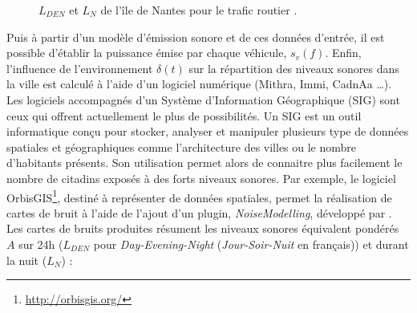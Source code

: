 \begin{figure}[t]
\centering
{}
\caption{$L_{DEN}$  et $L_N$  de l'île de Nantes pour le trafic routier \cite{nantes_carte}.}
\label{fig:carto_nantes}
\end{figure}

Puis à partir d'un modèle d'émission sonore et de ces données d'entrée, il est possible d'établir la puissance émise par chaque véhicule, $s_{v}(f)$.
Enfin, l'influence de l'environnement $\delta(t)$ sur la répartition des niveaux sonores dans la ville est calculé à l'aide d'un logiciel numérique (Mithra, Immi, CadnAa \dots). Les logiciels accompagnés d'un Système d'Information Géographique (SIG) sont ceux qui offrent actuellement le plus de possibilités. Un SIG est un outil informatique conçu pour stocker, analyser et manipuler plusieurs type de données spatiales et géographiques comme l'architecture des villes ou le nombre d'habitants présents. 
Son utilisation permet alors de connaitre plus facilement le nombre de citadins exposés à des forts niveaux sonores. 
Par exemple, le logiciel OrbisGIS\footnote{\url{http://orbisgis.org/}}, destiné à représenter de données spatiales, permet la réalisation de cartes de bruit à l'aide de l'ajout d'un plugin, \textit{NoiseModelling}, développé par \cite{fortin}. \\

Les cartes de bruits produites résument les niveaux sonores équivalent pondérés $A$ sur 24h ($L_{DEN}$ pour \textit{Day-Evening-Night} (\textit{Jour-Soir-Nuit} en français)) et durant la nuit ($L_N$) :

